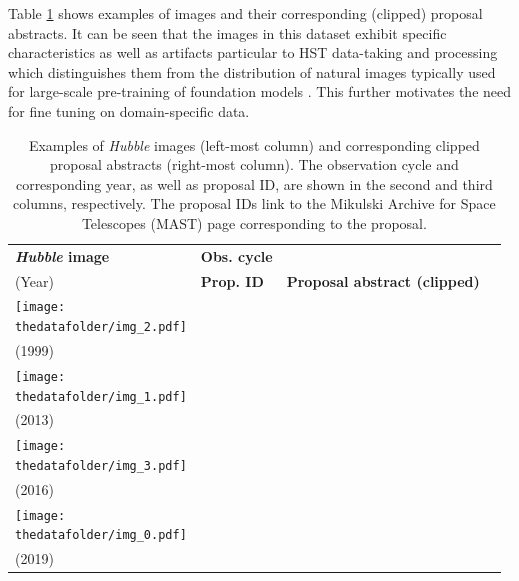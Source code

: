 \documentclass[10pt]{article} %
\newcommand{\hubble}{\emph{Hubble}\xspace}
\newcommand{\datafolder}[1]{\def\thedatafolder{#1}}
\begin{document}
Table \ref{tab:dataset} shows examples of images and their corresponding (clipped) proposal abstracts.
%
It can be seen that the images in this dataset exhibit specific characteristics as well as artifacts particular to HST data-taking and processing which distinguishes them from the distribution of natural images typically used for large-scale pre-training of foundation models \citep{deng2009imagenet}.
%
This further motivates the need for fine tuning on domain-specific data.

\datafolder{./plots/data/}

\begin{table}[h!]
  \centering
  \begin{tabular}{m{} p{1.9cm} p{1.9cm} m{7.5cm}}
      \toprule
      \centering \bfseries \hubble image & \centering \bfseries Obs. cycle \\ (Year) & \centering \bfseries Prop. ID & \centering \bfseries Proposal abstract (clipped) \tabularnewline
      \midrule
      \centering \texttt{[image: \\thedatafolder/img\_2.pdf]} & \centering  \\ (1999) & \centering  &  {\scriptsize } \tabularnewline
      \midrule
      \centering \texttt{[image: \\thedatafolder/img\_1.pdf]} & \centering  \\ (2013) & \centering  &  {\scriptsize } \tabularnewline
      \midrule
      \centering \texttt{[image: \\thedatafolder/img\_3.pdf]} & \centering  \\ (2016) & \centering  &  {\scriptsize } \tabularnewline
      \midrule
      \centering \texttt{[image: \\thedatafolder/img\_0.pdf]} & \centering  \\ (2019) & \centering  &  {\scriptsize } \tabularnewline
      \bottomrule
  \end{tabular}
  \caption{Examples of \hubble images (left-most column) and corresponding clipped proposal abstracts (right-most column). The observation cycle and corresponding year, as well as proposal ID, are shown in the second and third columns, respectively. The proposal IDs link to the Mikulski Archive for Space Telescopes (MAST) page corresponding to the proposal.}
  \label{tab:dataset}
\end{table}
\end{document}
